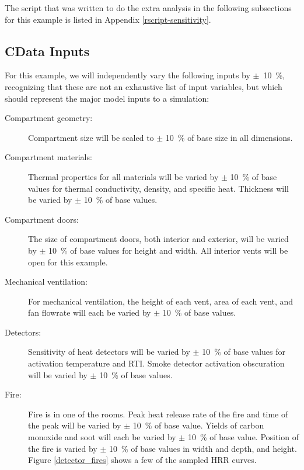 \documentclass[12pt,twoside]{book}
\begin{document}
The script that was written to do the extra analysis in the following subsections for this example is listed in Appendix \ref{rscript-sensitivity}.

\subsection{CData Inputs}
For this example, we will independently vary the following inputs by $\pm$~10~\%, recognizing that these are not an exhaustive list of input variables, but which should represent the major model inputs to a simulation:

\begin{description}
\item[Compartment geometry:] Compartment size will be scaled to $\pm$ 10~\% of base size in all dimensions.
\item[Compartment materials:] Thermal properties for all materials will be varied by $\pm$ 10~\% of base values for thermal conductivity, density, and specific heat. Thickness will be  varied by $\pm$ 10~\% of base values.
\item[Compartment doors:] The size of compartment doors, both interior and exterior, will be  varied by $\pm$ 10~\% of base values for height and width. All interior vents will be open for this example.
\item[Mechanical ventilation:] For mechanical ventilation, the height of each vent, area of each vent, and fan flowrate will each be varied by $\pm$ 10~\% of base values.
\item[Detectors:] Sensitivity of heat detectors will be varied by $\pm$ 10~\% of base values for activation temperature and RTI. Smoke detector activation obscuration will be varied by $\pm$ 10~\% of base values.
\item[Fire:] Fire is in one of the rooms. Peak heat release rate of the fire and time of the peak will be varied by $\pm$ 10~\% of base value. Yields of carbon monoxide and soot will each be varied by $\pm$ 10~\% of base value. Position of the fire is varied by $\pm$ 10~\% of base values in width and depth, and height. Figure \ref{detector_fires} shows a few of the sampled HRR curves.
\end{description}
\end{document}
